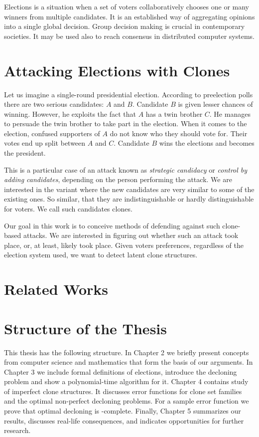 Elections is a situation when a set of voters collaboratively chooses one or many winners from multiple candidates.
It is an established way of aggregating opinions into a single global decision.
Group decision making is crucial in contemporary societies.
It may be used also to reach consensus in distributed computer systems.

\section{Attacking Elections with Clones}

Let us imagine a single-round presidential election.
According to preelection polls there are two serious candidates: $A$ and $B$.
Candidate $B$ is given lesser chances of winning.
However, he exploits the fact that $A$ has a twin brother $C$.
He manages to persuade the twin brother to take part in the election.
When it comes to the election, confused supporters of $A$ do not know who they should vote for.
Their votes end up split between $A$ and $C$.
Candidate $B$ wins the elections and becomes the president.

This is a particular case of an attack known as \textit{strategic candidacy} or \textit{control by adding candidates}, %
depending on the person performing the attack.
We are interested in the variant where the new candidates are very similar to some of the existing ones.
So similar, that they are indistinguishable or hardly distinguishable for voters.
We call such candidates clones.

Our goal in this work is to conceive methods of defending against such clone-based attacks.
We are interested in figuring out whether such an attack took place, or, at least, likely took place.
Given voters preferences, regardless of the election system used, we want to detect latent clone structures.

\section{Related Works}


\section{Structure of the Thesis}

This thesis has the following structure.
In Chapter 2 we briefly present concepts from computer science
and mathematics that form the basis of our arguments.
In Chapter 3 we include formal definitions of elections, introduce the decloning problem
and show a polynomial-time algorithm for it.
Chapter 4 contains study of imperfect clone structures.
It discusses error functions for clone set families and the optimal non-perfect decloning problems.
For a sample error function we prove that optimal decloning is \np-complete.
Finally, Chapter 5 summarizes our results, discusses real-life consequences,
and indicates opportunities for further research.
